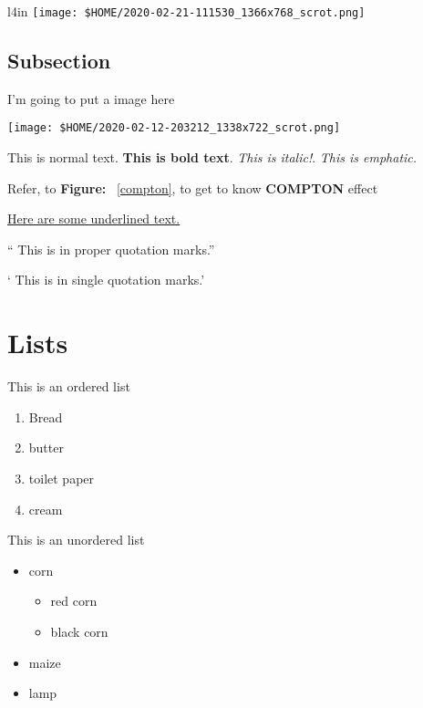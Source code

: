 \documentclass{article}	%
\begin{document}
\blindtext
\blindtext
\begin{wrapfigure}{l}{4in}
	\centering
	\texttt{[image: \$HOME/2020-02-21-111530\_1366x768\_scrot.png]}
	\caption{compton effect\label{compton}}
\end{wrapfigure}
\blindtext
\blindtext
\blindtext
\blindtext
\blindtext

	\subsection{Subsection}

	I'm going to put a image here

\begin{center}
\texttt{[image: \$HOME/2020-02-12-203212\_1338x722\_scrot.png]}
\end{center}

		This is normal text. \textbf{This is bold text}. \textit{This is italic!}. \emph{This is emphatic.}

		Refer, to \textbf{Figure: }~\ref{compton}, to get to know \textbf{COMPTON} effect

		\underline{Here are some underlined text.}


		`` This is in proper quotation marks.''

		` This is in single quotation marks.'

\section{Lists\label{list}}

This is an ordered list

\begin{enumerate}
	\item Bread\label{bread}
	\item butter
	\item toilet paper
	\item cream
\end{enumerate}

This is an unordered list

\begin{itemize}
		\item corn
			\begin{itemize}
				\item red corn
				\item black corn
			\end{itemize}
		\item maize
		\item lamp
\end{itemize}
\end{document}
